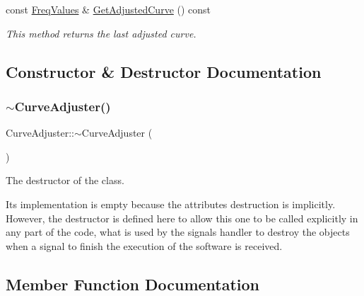 \begin{DoxyCompactItemize}
\mbox{\label{classCurveAdjuster_a613e815a190d44b7d64e70b08da82e1f}} 
const \hyperlink{structFreqValues}{Freq\+Values} \& \hyperlink{classCurveAdjuster_a613e815a190d44b7d64e70b08da82e1f}{Get\+Adjusted\+Curve} () const
\begin{DoxyCompactList}\small\item\em This method returns the last adjusted curve. \end{DoxyCompactList}\end{DoxyCompactItemize}


\subsection{Constructor \& Destructor Documentation}
\mbox{\label{classCurveAdjuster_ae1939fed50d532e46bef47db5e3883c3}} 
\subsubsection{\texorpdfstring{$\sim$\+Curve\+Adjuster()}{~CurveAdjuster()}}
{\footnotesize\ttfamily Curve\+Adjuster\+::$\sim$\+Curve\+Adjuster (\begin{DoxyParamCaption}{ }\end{DoxyParamCaption})\hspace{0.3cm}{\ttfamily [inline]}}



The destructor of the class. 

Its implementation is empty because the attributes destruction is implicitly. However, the destructor is defined here to allow this one to be called explicitly in any part of the code, what is used by the signals handler to destroy the objects when a signal to finish the execution of the software is received. 

\subsection{Member Function Documentation}
\mbox{\label{classCurveAdjuster_a3645614620645c7bfd86386576072d0a}} 
